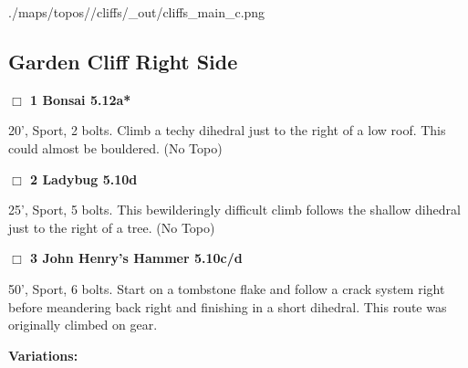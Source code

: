 	\begin{center}
	\begin{overpic}[width=0.9\linewidth]{./maps/topos//cliffs/_out/cliffs_main_c.png}
	\end{overpic}
	\end{center}
	\begin{multicols}{2}


\needspace{10em}
\subsection*{Garden Cliff Right Side}\label{bf:Garden Cliff Right Side}




\needspace{2em}
\label{rt:Bonsai}
\colorbox{Goldenrod!20}{
\parbox{0.95\linewidth}{
\hspace{-1ex}\textbf{$\Box$
1 Bonsai 5.12a*  
}}}
\begin{adjustwidth}{1.3em}{}			

20', Sport, 2 bolts. Climb a techy dihedral just to the right of a low roof. This could almost be bouldered.
  (No Topo)
\end{adjustwidth}




\needspace{2em}
\label{rt:Ladybug}
\colorbox{RoyalBlue!20}{
\parbox{0.95\linewidth}{
\hspace{-1ex}\textbf{$\Box$
2 Ladybug 5.10d  
}}}
\begin{adjustwidth}{1.3em}{}			

25', Sport, 5 bolts. This bewilderingly difficult climb follows the shallow dihedral just to the right of a tree.
  (No Topo)
\end{adjustwidth}




\needspace{2em}
\label{rt:John Henry's Hammer}
\colorbox{RoyalBlue!20}{
\parbox{0.95\linewidth}{
\hspace{-1ex}\textbf{$\Box$
3 John Henry's Hammer 5.10c/d  
}}}
\begin{adjustwidth}{1.3em}{}			

50', Sport, 6 bolts. Start on a tombstone flake and follow a crack system right before meandering back right and finishing in a short dihedral. This route was originally climbed on gear.
\end{adjustwidth}


\begin{adjustwidth}{0.5cm}{}				
\needspace{4em}
\textbf{Variations:} \newline


\end{adjustwidth}
\end{multicols}
